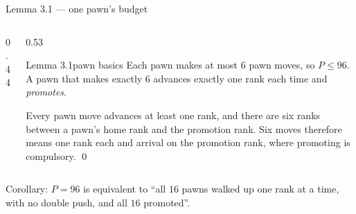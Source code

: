 \documentclass[aspectratio=169,10pt]{beamer}
\begin{document}
\begin{frame}{Lemma 3.1 --- one pawn's budget}
  \centering
  \vspace{0.2cm}
  \begin{columns}[c]
    \begin{column}{0.44\textwidth}\centering
      \figpawnfull
    \end{column}
    \begin{column}{0.53\textwidth}
      \begin{lcstate}{Lemma 3.1}{pawn basics}
        {\small Each pawn makes at most $6$ pawn moves, so $P \le 96$. A
        pawn that makes exactly $6$ advances exactly one rank each time and
        \emph{promotes}.}
      \end{lcstate}
      \begin{lcproof}
        {\small Every pawn move advances at least one rank, and there are
        six ranks between a pawn's home rank and the promotion rank. Six
        moves therefore means one rank each and arrival on the promotion
        rank, where promoting is compulsory. \qed}
      \end{lcproof}
    \end{column}
  \end{columns}
  \par\vspace{0.25cm}
  {\small\color{lcaccent}
   Corollary: $P = 96$ is equivalent to ``all $16$ pawns walked up one rank
   at a time, with no double push, and all $16$ promoted''.}
\end{frame}
\end{document}
